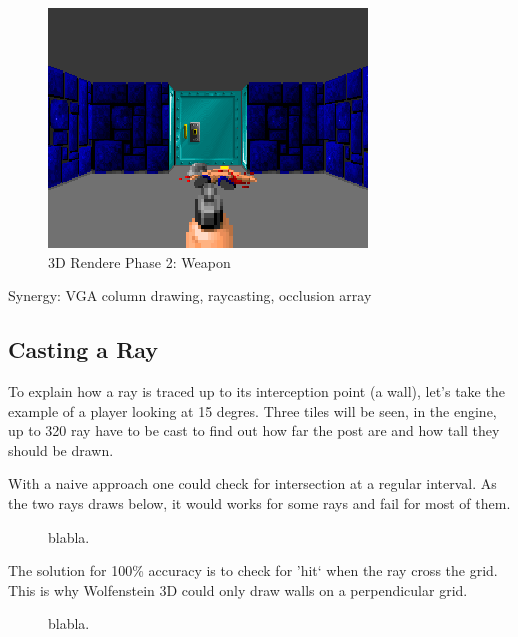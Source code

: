 \documentclass[book.tex]{subfiles}
\begin{document}
 \begin{figure}[H]
\centering
 \includegraphics[scale=1.3]{screenshots/wolf3d_7_fullframe.png}
 \caption{3D Rendere Phase 2: Weapon} \label{fig:mips}
 \end{figure}
 

   Synergy: VGA column drawing, raycasting, occlusion array














\subsection{Casting a Ray}
To explain how a ray is traced up to its interception point (a wall), let's take the example of a player looking at 15 degres. Three tiles will be seen, in the engine, up to 320 ray have to be cast to find out how far the post are and how tall they should be drawn.
\begin{figure}[H]
\centering
 
\end{figure}


With a naive approach one could check for intersection at a regular interval. As the two rays draws below, it would works for some rays and fail for most of them.
\begin{figure}[H]
\centering
 
 \caption{blabla.}
\end{figure}

The solution for 100\% accuracy is to check for 'hit` when the ray cross the grid. This is why Wolfenstein 3D could only draw walls on a perpendicular grid.
\begin{figure}[H]
\centering
 
 \caption{blabla.}
\end{figure}
\end{document}
